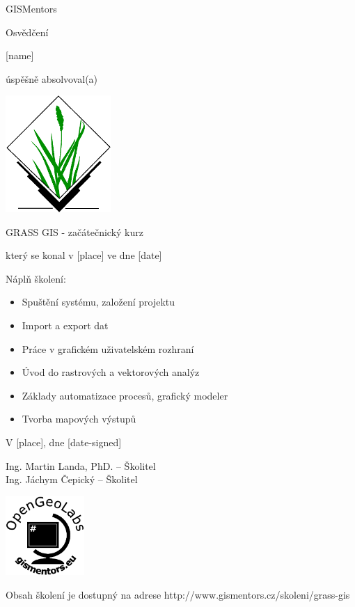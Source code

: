 \documentclass[12pt, a4paper]{letter}
\begin{document}
\pagestyle{empty}
\begin{center}

{\Large GISMentors}

{\Huge Osvědčení}

{\Large [name]}

úspěšně absolvoval(a)

\includegraphics[width=0.30\textwidth]{../images/grasslogo_vector.eps}

{\Large GRASS GIS - začátečnický kurz}

který se konal v [place] ve dne [date]
\end{center}

Náplň školení:

\begin{itemize}
    \item Spuštění systému, založení projektu
    \item Import a export dat
    \item Práce v grafickém uživatelském rozhraní
    \item Úvod do rastrových a vektorových analýz
    \item Základy automatizace procesů, grafický modeler
    \item Tvorba mapových výstupů
\end{itemize}

\vfill
\parbox{7cm}{

    V [place], dne [date-signed]\\

\vfill

    Ing. Martin Landa, PhD. -- Školitel\\

\vfill
    Ing. Jáchym Čepický -- Školitel
}
\hfill
\parbox{3cm}{
    \includegraphics[width=3cm]{../images/placka.eps}
}

\vfill

\begin{center}
{\footnotesize Obsah školení je dostupný na adrese
http://www.gismentors.cz/skoleni/grass-gis}
\end{center}
\end{document}
